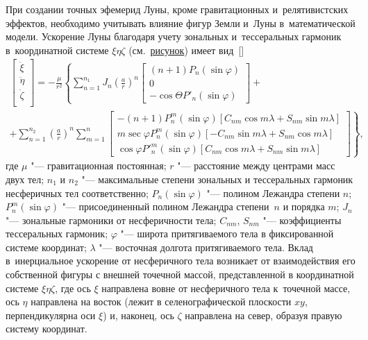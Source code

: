 При создании точных эфемерид Луны, кроме гравитационных и~релятивистских эффектов, необходимо учитывать влияние фигур Земли и~Луны в~математической модели. 
Ускорение Луны благодаря учету зональных и~тессеральных гармоник в~координатной системе $\xi\eta\zeta$ (см.~\hyperlink{fig:zaus:1}{рисунок}) имеет вид~[]
\begin{multline}
\label{zaus:eq7}
\begin{bmatrix}\ddot{\xi}\\ \ddot{\eta}\\ \ddot{\zeta}\\ \end{bmatrix} =
-\frac{\mu }{r^2}\left \{ \sum_{n=1}^{n_1} J_n \left ( \frac{a}{r} \right )^n
\begin{bmatrix}
(n+1)P_n(\sin \varphi)\\
0\\
-\cos \Theta P'_n (\sin \varphi)
\end{bmatrix} + \right .
\\
\left .+\sum_{n=1}^{n_2}\left ( \frac{a}{r} \right )^n \sum_{m=1}^{n}\begin{bmatrix}
-(n+1)P^m_n(\sin\varphi)[C_{nm}\cos m\lambda+ S_{nm}\sin m\lambda]\\
m \sec \varphi P^m_n(\sin\varphi)[-C_{nm}\sin m\lambda+ S_{nm}\cos m\lambda]\\
\cos \varphi P'^m_n(\sin\varphi)[C_{nm}\cos m\lambda+ S_{nm}\sin m\lambda]
\end{bmatrix}\right \},
\end{multline}
где $\mu$ "--- гравитационная постоянная; 
$r$ "--- расстояние между центрами масс двух тел; 
$n_1$ и $n_2$ "--- максимальные степени зональных и тессеральных гармоник несферичных тел соответственно; 
$P_n (\sin \varphi)$ "--- полином Лежандра степени $n$; 
$P^m_n (\sin \varphi)$ "--- присоединенный полином Лежандра степени~$n$ и порядка $m$; 
$J_n$ "--- зональные гармоники от несферичности тела; 
$C_{nm}$, $S_{nm}$ "--- коэффициенты тессеральных гармоник; 
$\varphi$ "--- широта притягиваемого тела в фиксированной системе координат; 
$\lambda$ "--- восточная долгота притягиваемого тела. 
Вклад в~инерциальное ускорение от несферичного тела возникает от взаимодействия его собственной фигуры с внешней точечной массой, представленной в координатной системе $\xi \eta \zeta$, 
где ось $\xi$ направлена вовне от несферичного тела к~точечной массе, 
ось $\eta$ направлена на восток (лежит в селенографической плоскости $xy$, 
перпендикулярна оси $\xi$) и, наконец, ось $\zeta$ направлена на север, образуя правую систему координат.





